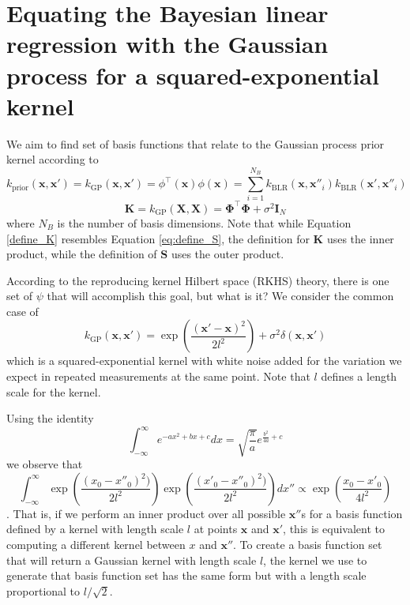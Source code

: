 \documentclass{article}
\begin{document}
\section{Equating the Bayesian linear regression with the Gaussian process for a squared-exponential kernel}

We aim to find set of basis functions that relate to the Gaussian process prior kernel according to 
\begin{equation}
\label{GP_prior}
     k_\text{prior}(\mathbf{x},\mathbf{x}')=k_\text{GP}(\mathbf{x},\mathbf{x}') = \phi^\top(\mathbf{x})\phi(\mathbf{x}) = \sum_{i=1}^{N_B}k_\text{BLR}(\mathbf{x},\mathbf{x}''_i)k_\text{BLR}(\mathbf{x'},\mathbf{x}''_i)
\end{equation}
\begin{equation}
\label{define_K}
     \mathbf{K}=k_{\text{GP}}(\mathbf{X},\mathbf{X}) = \boldsymbol{\Phi}^\top \boldsymbol{\Phi} + \sigma^2 \mathbf{I}_N
\end{equation}
where $N_B$ is the number of basis dimensions. Note that while Equation \ref{define_K} resembles Equation \ref{eq:define_S}, the definition for $\mathbf{K}$ uses the inner product, while the definition of $\mathbf{S}$ uses the outer product.  

According to the reproducing kernel Hilbert space (RKHS) theory, there is one set of $\psi$ that will accomplish this goal, but what is it? We consider the common case of 
\begin{equation}
\label{kernel}
    k_\text{GP}(\mathbf{x},\mathbf{x}') = \exp\left(\frac{(\mathbf{x}'-\mathbf{x})^2}{2l^2}\right) + \sigma^2 \delta(\mathbf{x}, \mathbf{x}')
\end{equation}
which is a squared-exponential kernel with white noise added for the variation we expect in repeated measurements at the same point. Note that $l$ defines a length scale for the kernel.

Using the identity 
\begin{equation}
\label{gaussian_integral_identity}
    \int_{-\infty}^{\infty}e^{-a x^2 + b x + c}dx = \sqrt{\frac{\pi}{a}}e^{\frac{b^2}{4a}+c}
\end{equation}
we observe that 
\begin{equation}
    \int_{-\infty}^{\infty}\exp\left(\frac{(x_0-x''_0)^2)}{2l^2}\right)\exp\left(\frac{(x'_0-x''_0)^2)}{2l^2}\right)dx''\propto\exp\left(\frac{x_0-x'_0}{4l^2}\right)
\end{equation}.
That is, if we perform an inner product over all possible $\mathbf{x}''$s for a basis function defined by a kernel with length scale $l$ at points $\mathbf{x}$ and $\mathbf{x}'$, this is equivalent to computing a different kernel between $x$ and $\mathbf{x}''$. To create a basis function set that will return a Gaussian kernel with length scale $l$, the kernel we use to generate that basis function set has the same form but with a length scale proportional to  $l/\sqrt{2}$.
\end{document}
